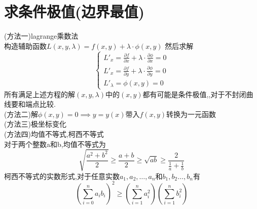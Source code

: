 \documentclass[12pt, a4paper, oneside, UTF8]{ctexbook}
\begin{document}
\section{求条件极值(边界最值)}
\begin{remark}
    (方法一)lagrange乘数法 \\
    构造辅助函数$L(x,y,\lambda)=f(x,y)+\lambda\cdot\phi(x,y)$ 然后求解 
    $$
    \begin{cases}
        L'_{x}= \frac{\partial f}{\partial x} + \lambda\cdot\frac{\partial\phi}{\partial x} = 0 \\
        L'_{x}= \frac{\partial f}{\partial y} + \lambda\cdot\frac{\partial\phi}{\partial y} = 0 \\
        L'_{\lambda} = \phi(x,y) = 0
    \end{cases}
    $$
    所有满足上述方程的解$(x,y,\lambda)$中的$(x,y)$都有可能是条件极值,{\color{red},对于不封闭曲线要和端点比较}. \\
    (方法二)解$\phi(x,y)=0\implies y = y(x)$带入$f(x,y)$转换为一元函数 \\
    (方法三)极坐标变化 \\
    (方法四)均值不等式,柯西不等式 \\
    对于两个整数a和b,均值不等式为 
    $$
    \sqrt{\frac{a^2+b^2}{2}}\geq\frac{a+b}{2}\geq\sqrt{ab}\geq\frac{2}{\frac{1}{a}+\frac{1}{b}}
    $$
    柯西不等式的实数形式,对于任意实数$a_1,a_2,\ldots,a_n$和$b_1,b_2\ldots,b_n$有
    $$
    \left(\sum_{i=0}^{n}a_ib_i\right)^2\geq\left(\sum_{i=1}^{n}a_i^2\right)\left(\sum_{i=1}^{n}b_i^2\right)
    $$
\end{remark}
\end{document}
